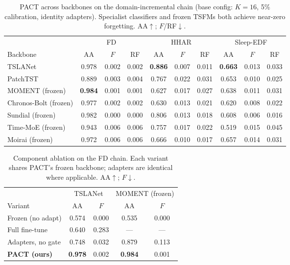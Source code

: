 \begin{table}[t]
\centering
\caption{PACT across backbones on the domain-incremental chain (base config:
$K{=}16$, 5\% calibration, identity adapters). Specialist classifiers and
frozen TSFMs both achieve near-zero forgetting. AA$\uparrow$; $F$/RF$\downarrow$.}
\label{tab:backbones}
\small
\begin{tabular}{l ccc ccc ccc}
\toprule
& \multicolumn{3}{c}{FD} & \multicolumn{3}{c}{HHAR} & \multicolumn{3}{c}{Sleep-EDF}\\
\cmidrule(lr){2-4}\cmidrule(lr){5-7}\cmidrule(lr){8-10}
Backbone & AA & $F$ & RF & AA & $F$ & RF & AA & $F$ & RF\\
\midrule
TSLANet & 0.978 & 0.002 & 0.002 & \textbf{0.886} & 0.007 & 0.011 & \textbf{0.663} & 0.013 & 0.033\\
PatchTST & 0.889 & 0.003 & 0.004 & 0.767 & 0.022 & 0.031 & 0.653 & 0.010 & 0.025\\
MOMENT (frozen) & \textbf{0.984} & 0.001 & 0.001 & 0.627 & 0.017 & 0.027 & 0.638 & 0.011 & 0.031\\
Chronos-Bolt (frozen) & 0.977 & 0.002 & 0.002 & 0.630 & 0.013 & 0.021 & 0.620 & 0.008 & 0.022\\
Sundial (frozen) & 0.982 & 0.000 & 0.000 & 0.806 & 0.013 & 0.018 & 0.608 & 0.006 & 0.016\\
Time-MoE (frozen) & 0.943 & 0.006 & 0.006 & 0.757 & 0.017 & 0.022 & 0.519 & 0.015 & 0.045\\
Moirai (frozen) & 0.972 & 0.006 & 0.006 & 0.666 & 0.010 & 0.017 & 0.657 & 0.014 & 0.031\\
\bottomrule
\end{tabular}
\end{table}

\begin{table}[t]
\centering
\caption{Component ablation on the FD chain. Each variant shares PACT's frozen
backbone; adapters are identical where applicable. AA$\uparrow$; $F$$\downarrow$.}
\label{tab:components}
\small
\begin{tabular}{l cc cc}
\toprule
& \multicolumn{2}{c}{TSLANet} & \multicolumn{2}{c}{MOMENT (frozen)}\\
\cmidrule(lr){2-3}\cmidrule(lr){4-5}
Variant & AA & $F$ & AA & $F$\\
\midrule
Frozen (no adapt) & 0.574 & 0.000 & 0.535 & 0.000\\
Full fine-tune & 0.640 & 0.283 & --- & ---\\
Adapters, no gate & 0.748 & 0.032 & 0.879 & 0.113\\
\textbf{PACT (ours)} & \textbf{0.978} & 0.002 & \textbf{0.984} & 0.001\\
\bottomrule
\end{tabular}
\end{table}

